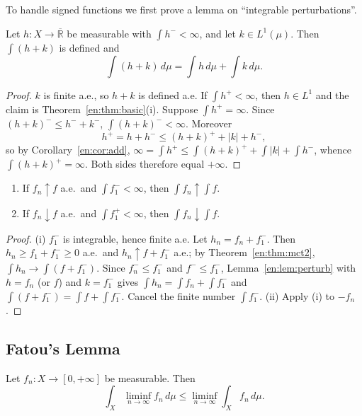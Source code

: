 \documentclass[11pt]{article}
\makeatletter
\newcommand{\envlabel}[1]{\protected@edef\@currentlabel{\themathenv}\label{#1}}
\makeatother
\begin{document}
To handle signed functions we first prove a lemma on ``integrable perturbations''.

\begin{lemma}\envlabel{en:lem:perturb}
Let $h:X\to\overline{\mathbb{R}}$ be measurable with $\int h^{-}<\infty$, and let $k\in L^{1}(\mu)$. Then $\int(h+k)$ is defined and
\[
\int(h+k)\,d\mu=\int h\,d\mu+\int k\,d\mu.
\]
\end{lemma}

\begin{proof}
$k$ is finite a.e., so $h+k$ is defined a.e. If $\int h^{+}<\infty$, then $h\in L^{1}$ and the claim is Theorem~\ref{en:thm:basic}(i). Suppose $\int h^{+}=\infty$. Since $(h+k)^{-}\leq h^{-}+k^{-}$, $\int(h+k)^{-}<\infty$. Moreover
\[
h^{+}=h+h^{-}\leq(h+k)^{+}+|k|+h^{-},
\]
so by Corollary~\ref{en:cor:add}, $\infty=\int h^{+}\leq\int(h+k)^{+}+\int|k|+\int h^{-}$, whence $\int(h+k)^{+}=\infty$. Both sides therefore equal $+\infty$.
\end{proof}

\begin{corollary}\envlabel{en:cor:mctgen}
\leavevmode
\begin{enumerate}
  \item If $f_{n}\uparrow f$ a.e.\ and $\int f_{1}^{-}<\infty$, then $\int f_{n}\uparrow\int f$.
  \item If $f_{n}\downarrow f$ a.e.\ and $\int f_{1}^{+}<\infty$, then $\int f_{n}\downarrow\int f$.
\end{enumerate}
\end{corollary}

\begin{proof}
(i) $f_{1}^{-}$ is integrable, hence finite a.e. Let $h_{n}=f_{n}+f_{1}^{-}$. Then $h_{n}\geq f_{1}+f_{1}^{-}\geq0$ a.e.\ and $h_{n}\uparrow f+f_{1}^{-}$ a.e.; by Theorem~\ref{en:thm:mct2}, $\int h_{n}\to\int(f+f_{1}^{-})$. Since $f_{n}^{-}\leq f_{1}^{-}$ and $f^{-}\leq f_{1}^{-}$, Lemma~\ref{en:lem:perturb} with $h=f_{n}$ (or $f$) and $k=f_{1}^{-}$ gives $\int h_{n}=\int f_{n}+\int f_{1}^{-}$ and $\int(f+f_{1}^{-})=\int f+\int f_{1}^{-}$. Cancel the finite number $\int f_{1}^{-}$. (ii) Apply (i) to $-f_{n}$.
\end{proof}

\subsection{Fatou's Lemma}

\begin{theorem}\envlabel{en:thm:fatou}
Let $f_{n}:X\to[0,+\infty]$ be measurable. Then
\[
\int_{X}\liminf_{n\to\infty}f_{n}\,d\mu\leq\liminf_{n\to\infty}\int_{X}f_{n}\,d\mu.
\]
\end{theorem}
\end{document}
